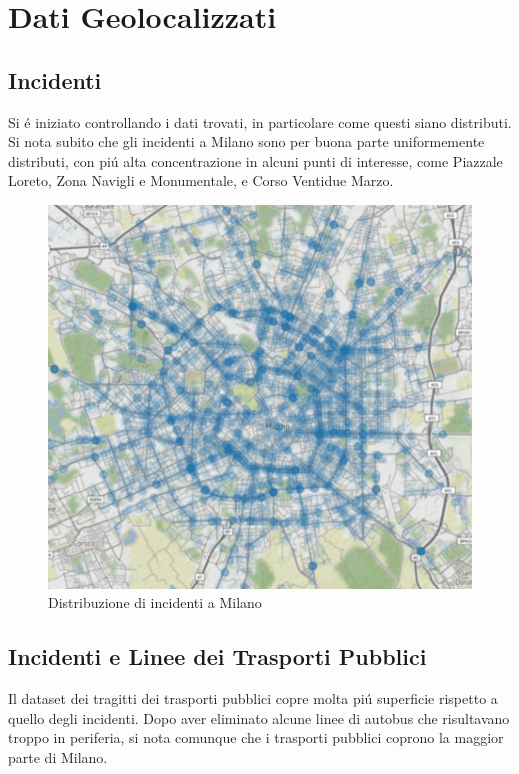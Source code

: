 \documentclass[a4paper]{report}
\begin{document}
\chapter{Dati Geolocalizzati}
\newpage
\section{Incidenti}

Si \'e iniziato controllando i dati trovati, in particolare come questi siano distributi.
Si nota subito che gli incidenti a Milano sono per buona parte uniformemente distributi, 
con pi\'u alta concentrazione in alcuni punti di interesse, come Piazzale Loreto, Zona Navigli 
e Monumentale, e Corso Ventidue Marzo.

\begin{figure}[!h]
    \includegraphics[width=\linewidth]{../src/incidenti/geo_incidenti.png}
    \caption{Distribuzione di incidenti a Milano}
    \label{fig:geo_incidenti}
\end{figure}



\newpage
\section{Incidenti e Linee dei Trasporti Pubblici}

Il dataset dei tragitti dei trasporti pubblici copre molta pi\'u superficie rispetto a 
quello degli incidenti.
Dopo aver eliminato alcune linee di autobus che risultavano troppo in periferia, 
si nota comunque che i trasporti pubblici coprono la maggior parte di Milano.
\end{document}
